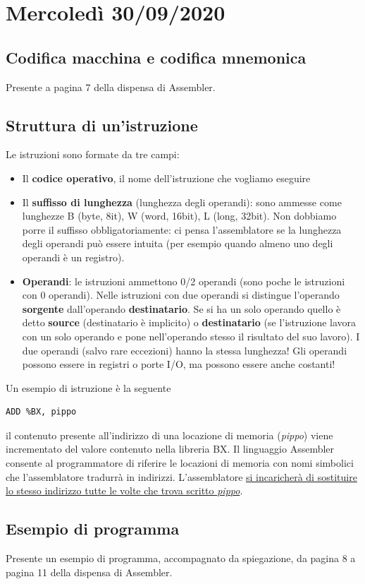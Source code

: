 \documentclass[11pt]{report}
\begin{document}
\chapter{Mercoledì 30/09/2020}
\section{Codifica macchina e codifica mnemonica}
Presente a pagina 7 della dispensa di Assembler.
\section{Struttura di un'istruzione}
Le istruzioni sono formate da tre campi:
\begin{itemize}
\item Il \textbf{codice operativo}, il nome dell'istruzione che vogliamo eseguire
\item Il \textbf{suffisso di lunghezza} (lunghezza degli operandi): sono ammesse come lunghezze B (byte, 8it), W (word, 16bit), L (long, 32bit). Non dobbiamo porre il suffisso obbligatoriamente: ci pensa l'assemblatore se la lunghezza degli operandi può essere intuita (per esempio quando almeno uno degli operandi è un registro).
\item \textbf{Operandi}: le istruzioni ammettono 0/2 operandi (sono poche le istruzioni con 0 operandi). Nelle istruzioni con due operandi si distingue l'operando \textbf{sorgente} dall'operando \textbf{destinatario}. Se si ha un solo operando quello è detto \textbf{source} (destinatario è implicito) o \textbf{destinatario} (se l'istruzione lavora con un solo operando e pone nell'operando stesso il risultato del suo lavoro). I due operandi (salvo rare eccezioni) hanno la stessa lunghezza! Gli operandi possono essere in registri o porte I/O, ma possono essere anche costanti!
\end{itemize}
Un esempio di istruzione è la seguente
\begin{verbatim}
ADD %BX, pippo
\end{verbatim}
il contenuto presente all'indirizzo di una locazione di memoria (\emph{pippo}) viene incrementato del valore contenuto nella libreria BX. 
Il linguaggio Assembler consente al programmatore di riferire le locazioni di memoria con nomi simbolici che l'assemblatore tradurrà in indirizzi. L'assemblatore \underline{si incaricherà di sostituire lo stesso indirizzo tutte le volte che trova scritto \emph{pippo}}.

\section{Esempio di programma}
Presente un esempio di programma, accompagnato da spiegazione, da pagina 8 a pagina 11 della dispensa di Assembler.
\end{document}
